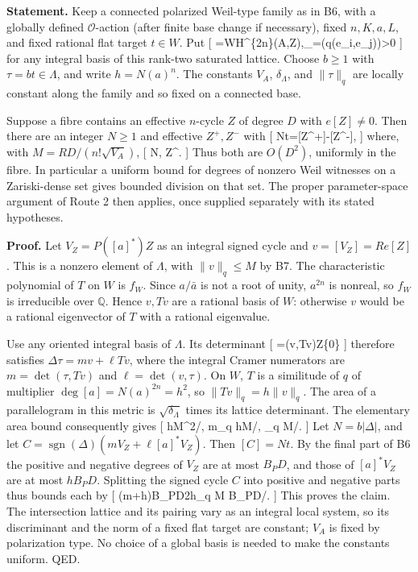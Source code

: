 \documentclass[11pt,a4paper]{article}
\theoremstyle{definition}
\begin{document}
\textbf{Statement.} Keep a connected polarized Weil-type family as in
B6, with a globally defined \(\mathcal O\)-action (after finite base
change if necessary), fixed \(n,K,a,L\), and fixed rational flat target
\(t\in W\). Put {[}
\Lambda=W\cap H\^{}\{2n\}(A,\mathbb Z),\qquad \delta\_\Lambda=\det(q(e\_i,e\_j))\textgreater0
{]} for any integral basis of this rank-two saturated lattice. Choose
\(b\geq1\) with \(\tau=bt\in\Lambda\), and write \(h=N(a)^n\). The
constants \(V_A\), \(\delta_\Lambda\), and \(\|\tau\|_q\) are locally
constant along the family and so fixed on a connected base.

Suppose a fibre contains an effective \(n\)-cycle \(Z\) of degree \(D\)
with \(e[Z]\ne0\). Then there are an integer \(N\geq1\) and effective
\(Z^+,Z^-\) with {[} Nt={[}Z\^{}+{]}-{[}Z\^{}-{]}, {]} where, with
\(M=RD/(n!\sqrt{V_A})\), {[}
N\leq{},\qquad
\deg Z\^{}\pm\leq{}. {]}
Thus both are \(O(D^2)\), uniformly in the fibre. In particular a
uniform bound for degrees of nonzero Weil witnesses on a Zariski-dense
set gives bounded division on that set. The proper parameter-space
argument of Route 2 then applies, once supplied separately with its
stated hypotheses.

\textbf{Proof.} Let \(V_Z=P([a]^*)Z\) as an integral signed cycle and
\(v=[V_Z]=R e[Z]\). This is a nonzero element of \(\Lambda\), with
\(\|v\|_q\leq M\) by B7. The characteristic polynomial of \(T\) on \(W\)
is \(f_W\). Since \(a/\bar a\) is not a root of unity, \(a^{2n}\) is
nonreal, so \(f_W\) is irreducible over \(\mathbb Q\). Hence \(v,Tv\)
are a rational basis of \(W\): otherwise \(v\) would be a rational
eigenvector of \(T\) with a rational eigenvalue.

Use any oriented integral basis of \(\Lambda\). Its determinant {[}
\Delta=\det(v,Tv)\in\mathbb Z\setminus\{0\} {]} therefore satisfies
\(\Delta\tau=m v+\ell Tv\), where the integral Cramer numerators are
\(m=\det(\tau,Tv)\) and \(\ell=\det(v,\tau)\). On \(W\), \(T\) is a
similitude of \(q\) of multiplier \(\deg[a]=N(a)^{2n}=h^2\), so
\(\|Tv\|_q=h\|v\|_q\). The area of a parallelogram in this metric is
\(\sqrt{\delta_\Lambda}\) times its lattice determinant. The elementary
area bound consequently gives {[}
\textbar{}\Delta\textbar{}\leq hM\^{}2/\sqrt{\delta_\Lambda},\quad
\textbar m\textbar{}\leq\textbar{}\tau\textbar\_q
hM/\sqrt{\delta_\Lambda},\quad
\textbar{}\ell\textbar{}\leq\textbar{}\tau\textbar\_q
M/\sqrt{\delta_\Lambda}. {]} Let \(N=b|\Delta|\), and let
\(C=\operatorname{sgn}(\Delta)(mV_Z+\ell[a]^*V_Z)\). Then \([C]=Nt\). By
the final part of B6 the positive and negative degrees of \(V_Z\) are at
most \(B_PD\), and those of \([a]^*V_Z\) are at most \(hB_PD\).
Splitting the signed cycle \(C\) into positive and negative parts thus
bounds each by {[}
(\textbar m\textbar+h\textbar{}\ell\textbar)B\_PD\leq 2h\textbar{}\tau\textbar\_q
M B\_PD/\sqrt{\delta_\Lambda}. {]} This proves the claim. The
intersection lattice and its pairing vary as an integral local system,
so its discriminant and the norm of a fixed flat target are constant;
\(V_A\) is fixed by polarization type. No choice of a global basis is
needed to make the constants uniform. QED.
\end{document}
